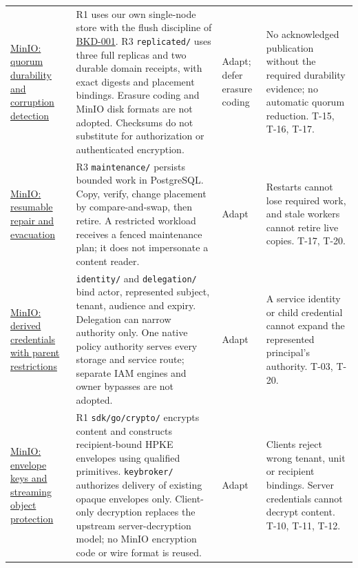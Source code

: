 \documentclass[11pt,a4paper]{article}
\newcommand{\code}[1]{{\small\nolinkurl{#1}}}
\newcommand{\rr}[1]{\hyperlink{req:#1}{#1}}
\begin{document}
\begin{longtable}{@{}P{0.21\textwidth}P{0.39\textwidth}P{0.10\textwidth}P{0.20\textwidth}@{}}
\href{https://github.com/minio/minio/blob/7aac2a2c5b7c882e68c1ce017d8256be2feea27f/cmd/erasure-object.go#L1440}{MinIO: quorum durability and corruption detection} & R1 uses our own single-node store with the flush discipline of \rr{BKD-001}. R3 \code{replicated/} uses three full replicas and two durable domain receipts, with exact digests and placement bindings. Erasure coding and MinIO disk formats are not adopted. Checksums do not substitute for authorization or authenticated encryption. & Adapt; defer erasure coding & No acknowledged publication without the required durability evidence; no automatic quorum reduction. T-15, T-16, T-17.\\
\href{https://github.com/minio/minio/blob/7aac2a2c5b7c882e68c1ce017d8256be2feea27f/cmd/erasure-server-pool-decom.go#L605}{MinIO: resumable repair and evacuation} & R3 \code{maintenance/} persists bounded work in PostgreSQL. Copy, verify, change placement by compare-and-swap, then retire. A restricted workload receives a fenced maintenance plan; it does not impersonate a content reader. & Adapt & Restarts cannot lose required work, and stale workers cannot retire live copies. T-17, T-20.\\
\href{https://github.com/minio/minio/blob/7aac2a2c5b7c882e68c1ce017d8256be2feea27f/cmd/admin-handlers-users.go#L2893}{MinIO: derived credentials with parent restrictions} & \code{identity/} and \code{delegation/} bind actor, represented subject, tenant, audience and expiry. Delegation can narrow authority only. One native policy authority serves every storage and service route; separate IAM engines and owner bypasses are not adopted. & Adapt & A service identity or child credential cannot expand the represented principal's authority. T-03, T-20.\\
\href{https://github.com/minio/minio/blob/7aac2a2c5b7c882e68c1ce017d8256be2feea27f/cmd/encryption-v1.go#L554}{MinIO: envelope keys and streaming object protection} & R1 \code{sdk/go/crypto/} encrypts content and constructs recipient-bound HPKE envelopes using qualified primitives. \code{keybroker/} authorizes delivery of existing opaque envelopes only. Client-only decryption replaces the upstream server-decryption model; no MinIO encryption code or wire format is reused. & Adapt & Clients reject wrong tenant, unit or recipient bindings. Server credentials cannot decrypt content. T-10, T-11, T-12.\\
\bottomrule
\end{longtable}
\end{document}
